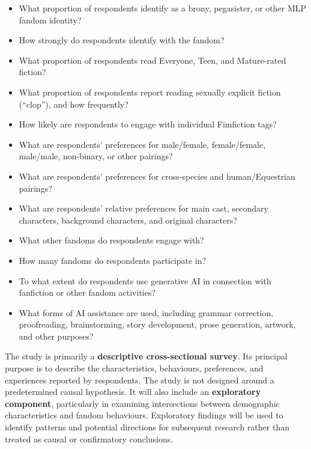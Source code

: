\begin{itemize}
\item What proportion of respondents identify as a brony, pegasister, or other MLP fandom identity?
\item How strongly do respondents identify with the fandom?
\item What proportion of respondents read Everyone, Teen, and Mature-rated fiction?
\item What proportion of respondents report reading sexually explicit fiction (``clop''), and how frequently?
\item How likely are respondents to engage with individual Fimfiction tags?
\item What are respondents' preferences for male/female, female/female, male/male, non-binary, or other pairings?
\item What are respondents' preferences for cross-species and human/Equestrian pairings?
\item What are respondents' relative preferences for main cast, secondary characters, background characters, and original characters?
\item What other fandoms do respondents engage with?
\item How many fandoms do respondents participate in?
\item To what extent do respondents use generative AI in connection with fanfiction or other fandom activities?
\item What forms of AI assistance are used, including grammar correction, proofreading, brainstorming, story development, prose generation, artwork, and other purposes?
\end{itemize}

The study is primarily a \textbf{descriptive cross-sectional survey}. Its principal purpose is to describe the characteristics, behaviours, preferences, and experiences reported by respondents. The study is not designed around a predetermined causal hypothesis. It will also include an \textbf{exploratory component}, particularly in examining intersections between demographic characteristics and fandom behaviours. Exploratory findings will be used to identify patterns and potential directions for subsequent research rather than treated as causal or confirmatory conclusions.

